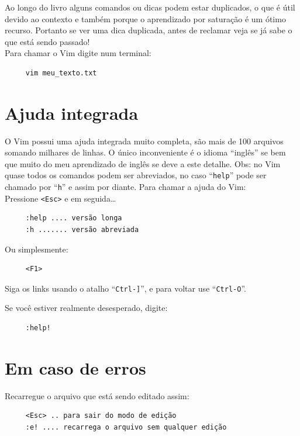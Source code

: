 \documentclass[10pt,a4paper,openany]{book}
\begin{document}
Ao longo do livro alguns comandos ou dicas podem estar duplicados, o que
é útil devido ao contexto e também porque o aprendizado por saturação
é um ótimo recurso. Portanto se ver uma dica duplicada, antes de
reclamar veja se já sabe o que está sendo passado! \\

Para chamar o Vim digite num terminal:

\begin{verbatim}
     vim meu_texto.txt
\end{verbatim}

\section{Ajuda integrada}

O Vim possui uma ajuda integrada muito completa, são mais de 100 arquivos
somando milhares de linhas. O único inconveniente é o idioma ``inglês'' se bem
que muito do meu aprendizado de inglês se deve a este detalhe.
Obs: no Vim quase todos os comandos podem ser abreviados, no caso
``\verb+help+'' pode ser chamado por ``\verb+h+'' e assim por diante.
Para chamar a ajuda do Vim:  \\

Pressione \verb|<Esc>| e em seguida\dots

\begin{verbatim}
     :help .... versão longa
     :h ....... versão abreviada
\end{verbatim}

Ou simplesmente:

\begin{verbatim}
     <F1>
\end{verbatim}

Siga os links usando o atalho ``\verb|Ctrl-]|'', e para voltar use
  ``\verb|Ctrl-O|''.

Se você estiver realmente desesperado, digite:

\begin{verbatim}
     :help!
\end{verbatim}

\section{Em caso de erros }\label{Em caso de erros }
Recarregue o arquivo que está sendo editado assim:

\begin{verbatim}
     <Esc> .. para sair do modo de edição
     :e! .... recarrega o arquivo sem qualquer edição
\end{verbatim}
\end{document}
